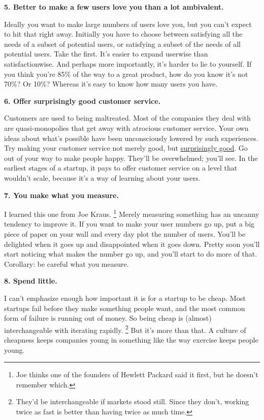 \documentclass[12pt]{book}
\begin{document}
\textbf{5. Better to make a few users love you than a lot ambivalent.}

Ideally you want to make large numbers of users love you, but you can't
expect to hit that right away. Initially you have to choose between
satisfying all the needs of a subset of potential users, or satisfying a
subset of the needs of all potential users. Take the first. It's easier
to expand userwise than satisfactionwise. And perhaps more importantly,
it's harder to lie to yourself. If you think you're 85\% of the way to a
great product, how do you know it's not 70\%? Or 10\%? Whereas it's easy
to know how many users you have.

\textbf{6. Offer surprisingly good customer service.}

Customers are used to being maltreated. Most of the companies they deal
with are quasi-monopolies that get away with atrocious customer service.
Your own ideas about what's possible have been unconsciously lowered by
such experiences. Try making your customer service not merely good, but
\href{http://www.diaryofawebsite.com/blog/2008/07/wufoo-and-the-art-of-customer-service/}{surprisingly
good}. Go out of your way to make people happy. They'll be overwhelmed;
you'll see. In the earliest stages of a startup, it pays to offer
customer service on a level that wouldn't scale, because it's a way of
learning about your users.

\textbf{7. You make what you measure.}

I learned this one from Joe Kraus. \footnote{Joe thinks one of the founders of Hewlett Packard said it first,
but he doesn't remember which.} Merely
measuring something has an uncanny tendency to improve it. If you want
to make your user numbers go up, put a big piece of paper on your wall
and every day plot the number of users. You'll be delighted when it goes
up and disappointed when it goes down. Pretty soon you'll start noticing
what makes the number go up, and you'll start to do more of that.
Corollary: be careful what you measure.

\textbf{8. Spend little.}

I can't emphasize enough how important it is for a startup to be cheap.
Most startups fail before they make something people want, and the most
common form of failure is running out of money. So being cheap is
(almost) interchangeable with iterating rapidly. \footnote{They'd be interchangeable if markets stood still. Since they
don't, working twice as fast is better than having twice as much time.}
But it's more than that. A culture of cheapness keeps companies young in
something like the way exercise keeps people young.
\end{document}
